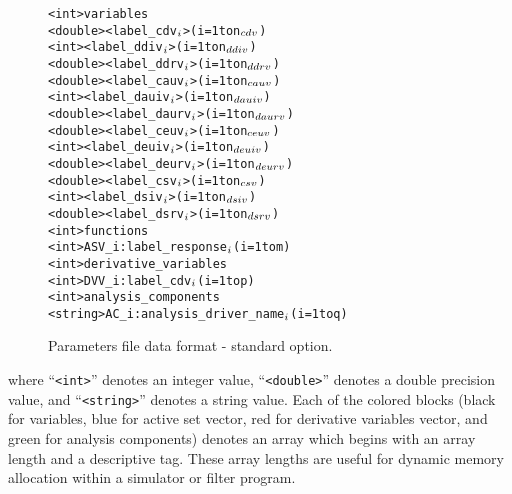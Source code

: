 \begin{figure}
  \centering
  \begin{bigbox}
  \begin{alltt}
    <int>    variables
    <double> <label_cdv\(\sb{i}\)>         (i = 1 to n\(\sb{cdv}\))
    <int>    <label_ddiv\(\sb{i}\)>        (i = 1 to n\(\sb{ddiv}\))
    <double> <label_ddrv\(\sb{i}\)>        (i = 1 to n\(\sb{ddrv}\))
    <double> <label_cauv\(\sb{i}\)>        (i = 1 to n\(\sb{cauv}\))
    <int>    <label_dauiv\(\sb{i}\)>       (i = 1 to n\(\sb{dauiv}\))
    <double> <label_daurv\(\sb{i}\)>       (i = 1 to n\(\sb{daurv}\))
    <double> <label_ceuv\(\sb{i}\)>        (i = 1 to n\(\sb{ceuv}\))
    <int>    <label_deuiv\(\sb{i}\)>       (i = 1 to n\(\sb{deuiv}\))
    <double> <label_deurv\(\sb{i}\)>       (i = 1 to n\(\sb{deurv}\))
    <double> <label_csv\(\sb{i}\)>         (i = 1 to n\(\sb{csv}\))
    <int>    <label_dsiv\(\sb{i}\)>        (i = 1 to n\(\sb{dsiv}\))
    <double> <label_dsrv\(\sb{i}\)>        (i = 1 to n\(\sb{dsrv}\)) \color{blue}
    <int>    functions
    <int>    ASV_i:label_response\(\sb{i}\)       (i = 1 to m) \color{red}
    <int>    derivative_variables
    <int>    DVV_i:label_cdv\(\sb{i}\)            (i = 1 to p) \color{green}
    <int>    analysis_components
    <string> AC_i:analysis_driver_name\(\sb{i}\)  (i = 1 to q)
  \end{alltt}
  \end{bigbox}
  \caption{Parameters file data format - standard option.}
  \label{variables:figure01}
\end{figure}

where ``\texttt{<int>}'' denotes an integer value,
``\texttt{<double>}'' denotes a double precision value, and
``\texttt{<string>}'' denotes a string value. Each of the colored
blocks (black for variables, blue for active set vector, red for
derivative variables vector, and green for analysis components)
denotes an array which begins with an array length and a descriptive
tag.  These array lengths are useful for dynamic memory allocation
within a simulator or filter program.

